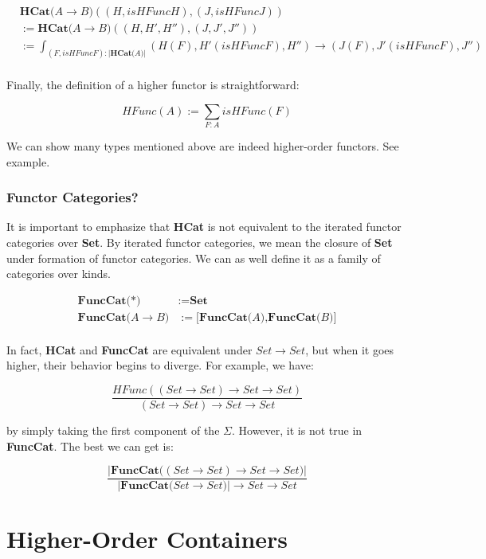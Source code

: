 \begin{align*}
& \textbf{HCat(} A \to B \textbf{)} ((H , isHFuncH) , (J, isHFuncJ)) \\
&:= \textbf{HCat(} A \to B \textbf{)} ((H , H' , H'') , (J, J' , J'')) \\
&:= \int_{(F , isHFuncF) : \lvert\textbf{HCat(} A \textbf{)}\rvert} (H(F) , H'(isHFuncF), H'') \to (J(F) , J'(isHFuncF), J'') \\
\end{align*}

Finally, the definition of a higher functor is straightforward:

\[ HFunc(A) := \sum_{F : A} isHFunc(F) \]

We can show many types mentioned above are indeed higher-order functors. See example.

\subsubsection*{Functor Categories?}

It is important to emphasize that \textbf{HCat} is not equivalent to the iterated functor categories over \textbf{Set}. By iterated functor categories, we mean the closure of \textbf{Set} under formation of functor categories. We can as well define it as a family of categories over kinds.

\begin{align*}
\textbf{FuncCat(} *\textbf{)} & := \textbf{Set} \\
\textbf{FuncCat(} A \to B \textbf{)} & := \textbf{[FuncCat(} A \textbf{),FuncCat(} B \textbf{)]} \\
\end{align*}

In fact, \textbf{HCat} and \textbf{FuncCat} are equivalent under $Set \to Set$, but when it goes higher, their behavior begins to diverge. For example, we have:

\[ \frac{HFunc((Set \to Set) \to Set \to Set)}{(Set \to Set) \to Set \to Set} \]

by simply taking the first component of the $\Sigma$. However, it is not true in \textbf{FuncCat}. The best we can get is:

\[ \frac{\lvert\textbf{FuncCat(} (Set \to Set) \to Set \to Set \textbf{)}\rvert}
  {\lvert\textbf{FuncCat(} Set \to Set \textbf{)}\rvert \to Set \to Set}
\]

\section{Higher-Order Containers}


